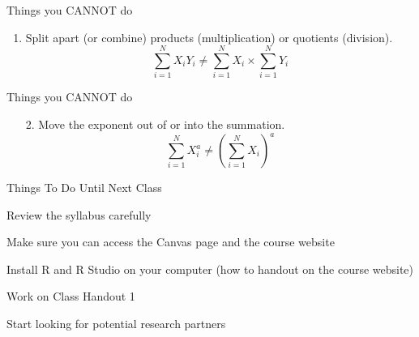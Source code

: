 \documentclass{./../div_teaching_slides}
\begin{document}
\begin{frame}{Things you CANNOT do}
\begin{enumerate}
\item Split apart (or combine) products (multiplication) or quotients (division).
$$ \sum_{i=1}^N X_i Y_i \neq  \sum_{i=1}^N X_i \times \sum_{i=1}^N Y_i   $$
\end{enumerate}
\end{frame}

\begin{frame}{Things you CANNOT do}
\begin{enumerate}
\item[2.] Move the exponent out of or into the summation.
$$ \sum_{i=1}^N X_i^a \neq  \left(\sum_{i=1}^N X_i\right)^a $$
\end{enumerate}
\end{frame}

\begin{frame}{Things To Do Until Next Class}
\begin{wenumerate}
\item Review the syllabus carefully
\item Make sure you can access the Canvas page and the course website
\item Install R and R Studio on your computer (how to handout on the course website)
\item Work on Class Handout 1
\item Start looking for potential research partners 
\end{wenumerate}
\end{frame}
\end{document}
